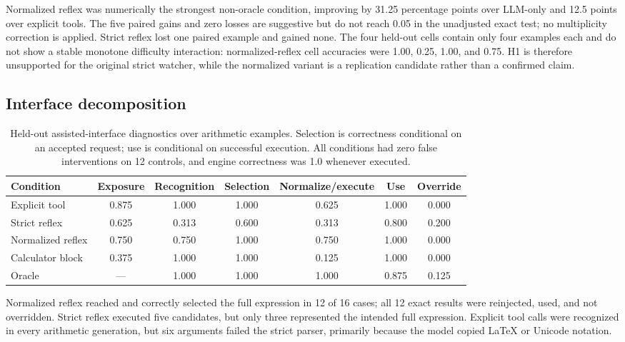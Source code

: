 \documentclass[11pt]{article}
\begin{document}
Normalized reflex was numerically the strongest non-oracle condition, improving
by 31.25 percentage points over LLM-only and 12.5 points over explicit tools.
The five paired gains and zero losses are suggestive but do not reach 0.05 in
the unadjusted exact test; no multiplicity correction is applied. Strict reflex
lost one paired example and gained none. The four held-out cells contain only
four examples each and do not show a stable monotone difficulty interaction:
normalized-reflex cell accuracies were 1.00, 0.25, 1.00, and 0.75. H1 is
therefore unsupported for the original strict watcher, while the normalized
variant is a replication candidate rather than a confirmed claim.

\subsection{Interface decomposition}

\begin{table}[t]
\centering
\small
\caption{Held-out assisted-interface diagnostics over arithmetic examples.
Selection is correctness conditional on an accepted request; use is conditional
on successful execution. All conditions had zero false interventions on 12
controls, and engine correctness was 1.0 whenever executed.}
\label{tab:heldout-pipeline}
\begin{tabular}{@{}lcccccc@{}}
\toprule
Condition & Exposure & Recognition & Selection & Normalize/execute & Use & Override \\
\midrule
Explicit tool      & 0.875 & 1.000 & 1.000 & 0.625 & 1.000 & 0.000 \\
Strict reflex      & 0.625 & 0.313 & 0.600 & 0.313 & 0.800 & 0.200 \\
Normalized reflex  & 0.750 & 0.750 & 1.000 & 0.750 & 1.000 & 0.000 \\
Calculator block   & 0.375 & 1.000 & 1.000 & 0.125 & 1.000 & 0.000 \\
Oracle             & ---   & 1.000 & 1.000 & 1.000 & 0.875 & 0.125 \\
\bottomrule
\end{tabular}
\end{table}

Normalized reflex reached and correctly selected the full expression in 12 of
16 cases; all 12 exact results were reinjected, used, and not overridden. Strict
reflex executed five candidates, but only three represented the intended full
expression. Explicit tool calls were recognized in every arithmetic generation,
but six arguments failed the strict parser, primarily because the model copied
LaTeX or Unicode notation.
\end{document}
